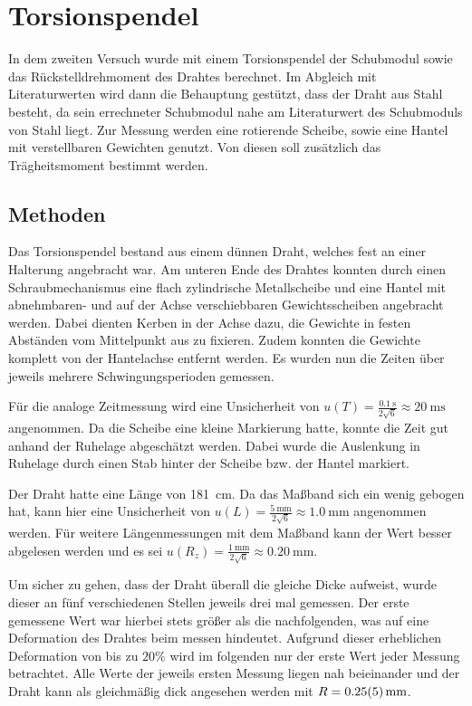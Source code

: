 
\section{Torsionspendel}
In dem zweiten Versuch wurde mit einem Torsionspendel der Schubmodul sowie das Rückstelldrehmoment des Drahtes berechnet.
Im Abgleich mit Literaturwerten wird dann die Behauptung gestützt, dass der Draht aus Stahl besteht, da sein errechneter Schubmodul nahe am Literaturwert des Schubmoduls von Stahl liegt.
Zur Messung werden eine rotierende Scheibe, sowie eine Hantel mit verstellbaren Gewichten genutzt.
Von diesen soll zusätzlich das Trägheitsmoment bestimmt werden.

\subsection{Methoden}
Das Torsionspendel bestand aus einem dünnen Draht, welches fest an einer Halterung angebracht war.
Am unteren Ende des Drahtes konnten durch einen Schraubmechanismus eine flach zylindrische Metallscheibe und eine Hantel mit abnehmbaren- und auf der Achse verschiebbaren Gewichtsscheiben angebracht werden.
Dabei dienten Kerben in der Achse dazu, die Gewichte in festen Abständen vom Mittelpunkt aus zu fixieren.
Zudem konnten die Gewichte komplett von der Hantelachse entfernt werden.
Es wurden nun die Zeiten über jeweils mehrere Schwingungsperioden gemessen.

Für die analoge Zeitmessung wird eine Unsicherheit von $u(T) = \frac{\SI{0,1}{\second}}{2\sqrt{6}}\approx \SI{20}{\milli\second}$ angenommen.
Da die Scheibe eine kleine Markierung hatte, konnte die Zeit gut anhand der Ruhelage abgeschätzt werden.
Dabei wurde die Auslenkung in Ruhelage durch einen Stab hinter der Scheibe bzw. der Hantel markiert.

Der Draht hatte eine Länge von \SI{181}{\centi\meter}.
Da das Maßband sich ein wenig gebogen hat, kann hier eine Unsicherheit von $u(L) = \frac{\SI{5}{\milli\meter}}{2\sqrt6}\approx \SI{1,0}{\milli\meter}$ angenommen werden.
Für weitere Längenmessungen mit dem Maßband kann der Wert besser abgelesen werden und es sei $u(R_z) = \frac{\SI{1}{\milli\meter}}{2\sqrt{6}} \approx \SI{0,20}{\milli\meter}$.

Um sicher zu gehen, dass der Draht überall die gleiche Dicke aufweist, wurde dieser an fünf verschiedenen Stellen jeweils drei mal gemessen.
Der erste gemessene Wert war hierbei stets größer als die nachfolgenden, was auf eine Deformation des Drahtes beim messen hindeutet.
Aufgrund dieser erheblichen Deformation von bis zu $20\%$ wird im folgenden nur der erste Wert jeder Messung betrachtet.
Alle Werte der jeweils ersten Messung liegen nah beieinander und der Draht kann als gleichmäßig dick angesehen werden mit $R = \SI{0,25 +- 0,05}{\milli\meter}$.

